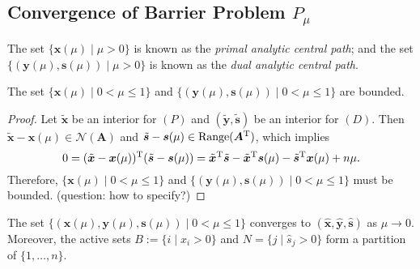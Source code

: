 \subsection{Convergence of Barrier Problem $P_\mu$}

The set $\{\bm x(\mu)\mid\mu>0\}$ is known as the \emph{primal analytic central path}; and the set
$\{(\bm y(\mu),\bm s(\mu))\mid\mu>0\}$ is known as the \emph{dual analytic central path}.
\begin{proposition}
The set $\{\bm x(\mu)\mid 0<\mu\le 1\}$ and $\{(\bm y(\mu),\bm s(\mu))\mid 0<\mu\le 1\}$ are bounded.
\end{proposition}
\begin{proof}
Let $\tilde{\bm x}$ be an interior for $(P)$ and $(\tilde{\bm y},\tilde{\bm s})$ be an interior for $(D)$. Then $\tilde{\bm x} - \bm x(\mu)\in\mathcal{N}(\bm A)$ and $\tilde{\bm s} - \bm s(\mu)\in\text{Range}(\bm A^{\mathrm T})$, which implies
\[
0 = (\tilde{\bm x} - \bm x(\mu))^{\mathrm T} (\tilde{\bm s} - \bm s(\mu))
=\tilde{\bm x}^{\mathrm T}\tilde{\bm s} - \tilde{\bm x}^{\mathrm T}\bm s(\mu) -\tilde{\bm s}^{\mathrm T}\bm x(\mu) + n\mu.
\]
Therefore, $\{\bm x(\mu)\mid 0<\mu\le 1\}$ and $\{(\bm y(\mu),\bm s(\mu))\mid 0<\mu\le 1\}$ must be bounded. (question: how to specify?)
\end{proof}

\begin{proposition}
The set $\{(\bm x(\mu),\bm y(\mu),\bm s(\mu))\mid 0<\mu\le 1\}$ converges to $(\hat{\bm x},\hat{\bm y},\hat{\bm s})$ as $\mu\to0$. Moreover, the active sets $B:=\{i\mid\hat x_i>0\}$ and $N=\{j\mid \hat{s}_j>0\}$ form a partition of $\{1,\dots,n\}$.
\end{proposition}

